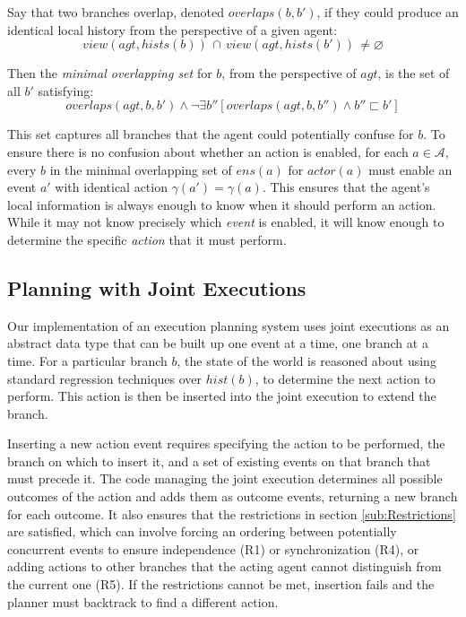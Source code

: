 Say that two branches overlap, denoted $overlaps(b,b')$, if they
could produce an identical local history from the perspective of a
given agent:\[
view(agt,hists(b))\,\cap\, view(agt,hists(b'))\,\neq\varnothing\]


Then the \emph{minimal overlapping set} for $b$, from the perspective
of $agt$, is the set of all $b'$ satisfying:\[
overlaps(agt,b,b')\wedge\neg\exists b''\left[overlaps(agt,b,b'')\wedge b''\sqsubset b'\right]\]


This set captures all branches that the agent could potentially confuse
for $b$. To ensure there is no confusion about whether an action
is enabled, for each $a\in\mathcal{A}$, every $b$ in the minimal
overlapping set of $ens(a)$ for $actor(a)$ must enable an event
$a'$ with identical action $\gamma(a')=\gamma(a)$. This ensures
that the agent's local information is always enough to know when it
should perform an action. While it may not know precisely which \emph{event}
is enabled, it will know enough to determine the specific \emph{action}
that it must perform.


\subsection{Planning with Joint Executions}

Our implementation of an execution planning system uses joint executions
as an abstract data type that can be built up one event at a time,
one branch at a time. For a particular branch $b$, the state of the
world is reasoned about using standard regression techniques over
$hist(b)$, to determine the next action to perform. This action is
then be inserted into the joint execution to extend the branch.

Inserting a new action event requires specifying the action to be
performed, the branch on which to insert it, and a set of existing
events on that branch that must precede it. The code managing the
joint execution determines all possible outcomes of the action and
adds them as outcome events, returning a new branch for each outcome.
It also ensures that the restrictions in section \ref{sub:Restrictions}
are satisfied, which can involve forcing an ordering between potentially
concurrent events to ensure independence (R1) or synchronization (R4),
or adding actions to other branches that the acting agent cannot distinguish
from the current one (R5). If the restrictions cannot be met, insertion
fails and the planner must backtrack to find a different action.

